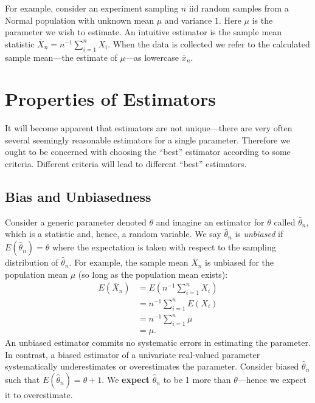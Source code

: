 \documentclass[
]{book}
\begin{document}
For example, consider an experiment sampling \(n\) iid random samples from a Normal population with unknown mean \(\mu\) and variance \(1\). Here \(\mu\) is the parameter we wish to estimate. An intuitive estimator is the sample mean statistic \(\overline X_n = n^{-1}\sum_{i=1}^n X_i\). When the data is collected we refer to the calculated sample mean---the estimate of \(\mu\)---as lowercase \(\overline x_n\).

\hypertarget{properties-of-estimators}{%
\section{Properties of Estimators}\label{properties-of-estimators}}

It will become apparent that estimators are not unique---there are very often several seemingly reasonable estimators for a single parameter. Therefore we ought to be concerned with choosing the ``best'' estimator according to some criteria. Different criteria will lead to different ``best'' estimators.

\hypertarget{bias-and-unbiasedness}{%
\subsection{Bias and Unbiasedness}\label{bias-and-unbiasedness}}

Consider a generic parameter denoted \(\theta\) and imagine an estimator for \(\theta\) called \(\hat\theta_n\), which is a statistic and, hence, a random variable. We say \(\hat\theta_n\) is \emph{unbiased} if \(E(\hat\theta_n)=\theta\) where the expectation is taken with respect to the sampling distribution of \(\hat\theta_n\). For example, the sample mean \(\overline X_n\) is unbiased for the population mean \(\mu\) (so long as the population mean exists):
\begin{align*}
E(\overline X_n) &= E\left(n^{-1}\sum_{i=1}^n X_i\right)\\
& = n^{-1}\sum_{i=1}^n E(X_i)\\
& = n^{-1}\sum_{i=1}^n \mu\\
& = \mu.
\end{align*}
An unbiased estimator commits no systematic errors in estimating the parameter. In contrast, a biased estimator of a univariate real-valued parameter systematically underestimates or overestimates the parameter. Consider biased \(\hat\theta_n\) such that \(E(\hat\theta_n) = \theta + 1\). We \textbf{expect} \(\hat\theta_n\) to be 1 more than \(\theta\)---hence we expect it to overestimate.
\end{document}
